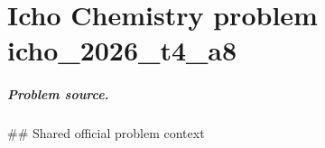 
\chapter{Icho Chemistry problem icho\_2026\_t4\_a8}
\label{ch:IChO2026Problems_problem_icho_2026_t4_a8}

\paragraph{Problem source.}
\#\# Shared official problem context
